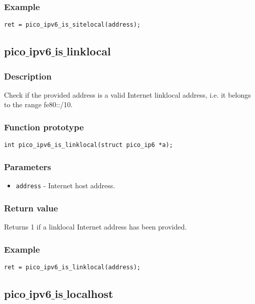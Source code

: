 \subsubsection*{Example}
\begin{verbatim}
ret = pico_ipv6_is_sitelocal(address);
\end{verbatim}

\subsection{pico$\_$ipv6$\_$is$\_$linklocal}
\subsubsection*{Description}
Check if the provided address is a valid Internet linklocal address, i.e. it belongs to the range fe80::/10.
\subsubsection*{Function prototype}
\begin{verbatim}
int pico_ipv6_is_linklocal(struct pico_ip6 *a);
\end{verbatim}
\subsubsection*{Parameters}
\begin{itemize}[noitemsep]
\item \texttt{address} - Internet host address.
\end{itemize}
\subsubsection*{Return value}
Returns 1 if a linklocal Internet address has been provided.
\subsubsection*{Example}
\begin{verbatim}
ret = pico_ipv6_is_linklocal(address);
\end{verbatim}

\subsection{pico$\_$ipv6$\_$is$\_$localhost}

